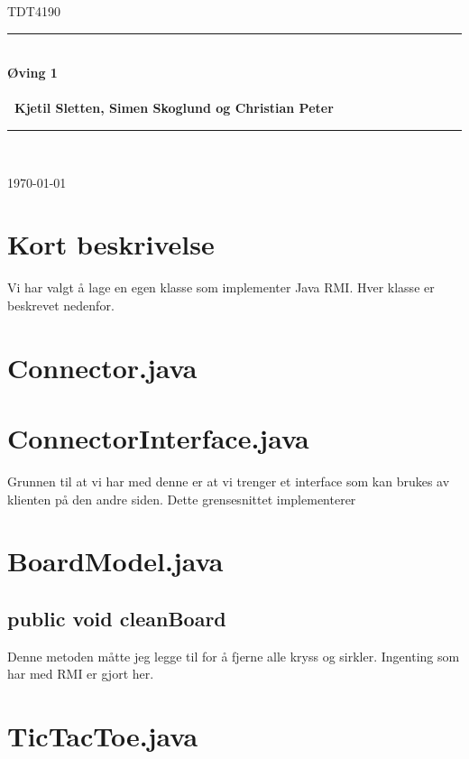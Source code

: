 \documentclass[11pt, a4paper]{article}	%
\begin{document}
\begin{titlepage}
\newcommand{\HRule}{\rule{\linewidth}{0.5mm}}
 
\begin{center}
 

\textsc{\huge TDT4190 }\\[2.0cm]

 
\HRule \\[0.3cm]
{\huge \bfseries  Øving  1
\\\ \\\ \LARGE Kjetil Sletten, Simen Skoglund og Christian Peter }\\[0.4cm]
\HRule \\[1.5cm]
 
\vfill
 
{\large \today}
 
\end{center}
\end{titlepage}

\section{Kort beskrivelse}
Vi har valgt å lage en egen klasse som implementer Java RMI. Hver klasse er beskrevet nedenfor.

\section{Connector.java}

\section{ConnectorInterface.java}
Grunnen til at vi har med denne er at vi trenger et interface som kan brukes av klienten på den andre siden. Dette grensesnittet implementerer 

\section{BoardModel.java}
\subsection*{public void cleanBoard}
Denne metoden måtte jeg legge til for å fjerne alle kryss og sirkler. Ingenting som har med RMI er gjort her.

\section{TicTacToe.java}


\newpage
\begin{thebibliography}{2}


\end{thebibliography}
\end{document}

